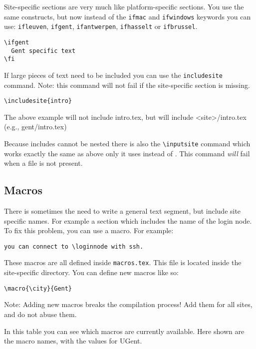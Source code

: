 \documentclass[11pt,a4paper]{article}
\begin{document}
Site-specific sections are very much like platform-specific sections. You use
the same constructs, but now instead of the \texttt{ifmac} and \texttt{ifwindows}
keywords you can use: \texttt{ifleuven}, \texttt{ifgent}, \texttt{ifantwerpen},
\texttt{ifhasselt} or \texttt{ifbrussel}.

\begin{verbatim}
\ifgent
  Gent specific text
\fi
\end{verbatim}

If large pieces of text need to be included you can use the
\lstinline|includesite| command.
Note: this command will not fail if the site-specific section is missing.

\begin{verbatim}
\includesite{intro}
\end{verbatim}

The above example will not include intro.tex, but will include <site>/intro.tex (e.g., gent/intro.tex)

Because includes cannot be nested there is also the \lstinline|\inputsite| command
which works exactly the same as above only it uses \lstinline|| instead of
\lstinline||. This command \emph{will} fail when a file is not present.

\subsection{Macros}
\label{sec:macros}

There is sometimes the need to write a general text segment, but include site
specific names. For example a section which includes the name of the login node.
To fix this problem, you can use a macro. For example:

\begin{verbatim}
you can connect to \loginnode with ssh.
\end{verbatim}

These macros are all defined inside \lstinline|macros.tex|. This file is located
inside the site-specific directory. You can define new macros like so:
\begin{verbatim}
\macro{\city}{Gent}
\end{verbatim}

Note: Adding new macros breaks the compilation process! Add them for all sites,
and do not abuse them.



In this table you can see which macros are currently available. Here shown are
the macro names, with the values for UGent.
\end{document}
